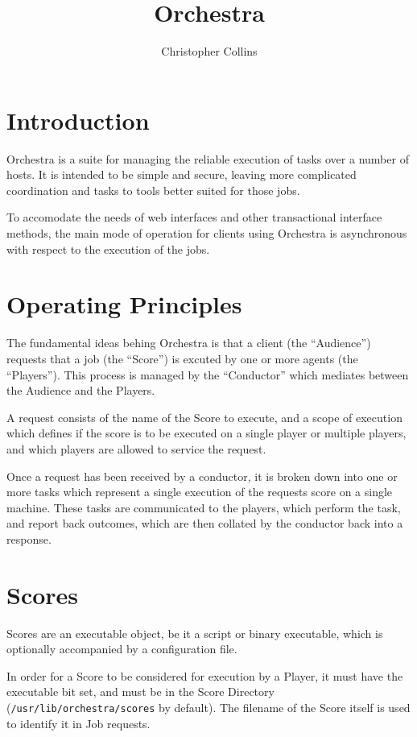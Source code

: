 \documentclass[a4paper]{article}
\begin{document}
\title{Orchestra}
\author{Christopher Collins}
\maketitle

\section{Introduction}

Orchestra is a suite for managing the reliable execution of tasks over
a number of hosts.  It is intended to be simple and secure, leaving
more complicated coordination and tasks to tools better suited for
those jobs.

To accomodate the needs of web interfaces and other transactional
interface methods, the main mode of operation for clients using
Orchestra is asynchronous with respect to the execution of the jobs.

\section{Operating Principles}

The fundamental ideas behing Orchestra is that a client (the
``Audience'') requests that a job (the ``Score'') is excuted by one or
more agents (the ``Players'').  This process is managed by the
``Conductor'' which mediates between the Audience and the Players.

A request consists of the name of the Score to execute, and a scope of
execution which defines if the score is to be executed on a single
player or multiple players, and which players are allowed to service
the request.

Once a request has been received by a conductor, it is broken down
into one or more tasks which represent a single execution of the
requests score on a single machine.  These tasks are communicated to
the players, which perform the task, and report back outcomes, which
are then collated by the conductor back into a response.

\section{Scores}

Scores are an executable object, be it a script or binary executable,
which is optionally accompanied by a configuration file.

In order for a Score to be considered for execution by a Player, it
must have the executable bit set, and must be in the Score Directory
({\tt /usr/lib/orchestra/scores} by default).  The filename of the
Score itself is used to identify it in Job requests.
\end{document}
